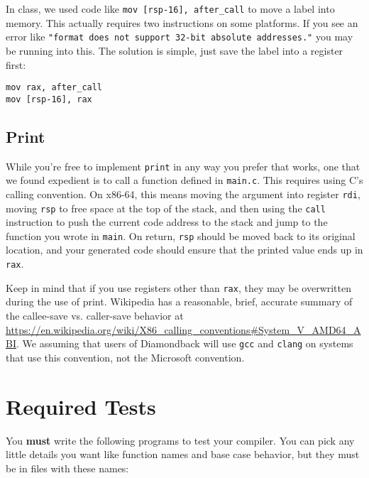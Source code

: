 \documentclass[10pt, oneside]{article}
\begin{document}
In class, we used code like {\tt mov [rsp-16], after\_call} to move a label
into memory. This actually requires two instructions on some platforms. If
you see an error like {\tt "format does not support 32-bit absolute
addresses."} you may be running into this. The solution is simple, just save
the label into a register first:

\begin{lstlisting}
mov rax, after_call
mov [rsp-16], rax
\end{lstlisting}

\subsection*{Print}

While you're free to implement {\tt print} in any way you prefer that works,
one that we found expedient is to call a function defined in {\tt main.c}.
This requires using C's calling convention. On x86-64, this means moving the
argument into register {\tt rdi}, moving {\tt rsp} to free space at the top
of the stack, and then using the {\tt call} instruction to push the current
code address to the stack and jump to the function you wrote in {\tt main}.
On return, {\tt rsp} should be moved back to its original location, and your
generated code should ensure that the printed value ends up in {\tt rax}.

Keep in mind that if you use registers other than {\tt rax}, they may be
overwritten during the use of print. Wikipedia has a reasonable, brief,
accurate summary of the callee-save vs. caller-save behavior at
\url{https://en.wikipedia.org/wiki/X86_calling_conventions\#System_V_AMD64_ABI}.
We assuming that users of Diamondback will use {\tt gcc} and {\tt clang} on
systems that use this convention, not the Microsoft convention.

\section*{Required Tests}

You {\bf must} write the following programs to test your compiler. You can
pick any little details you want like function names and base case behavior,
but they must be in files with these names:
\end{document}
